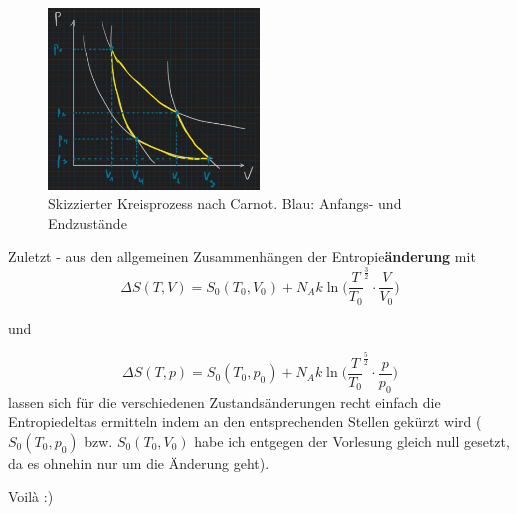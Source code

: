 \begin{figure}[h]
    \centering
    \includegraphics[width=0.5\textwidth]{entries/8/carnot.jpg}
    \caption{Skizzierter Kreisprozess nach Carnot. Blau: Anfangs- und Endzustände}
    \label{fig:carnot}
\end{figure}

Zuletzt - aus den allgemeinen Zusammenhängen der Entropie\textbf{änderung} mit
\begin{equation}
    \Delta S(T,V) = S_0 (T_0 ,V_0 ) + N_A k \ln{\biggl(\frac{T}{T_0}^{\frac{3}{2}} \cdot \frac{V}{V_0}\biggr)}
\end{equation}
\begin{center}
    und
\end{center}
\begin{equation}
    \Delta S(T,p) = S_0 (T_0 ,p_0 ) + N_A k \ln{\biggl(\frac{T}{T_0}^{\frac{5}{2}} \cdot \frac{p}{p_0}\biggr)}
\end{equation}
lassen sich für die verschiedenen Zustandsänderungen recht einfach die Entropiedeltas ermitteln indem an den entsprechenden
Stellen gekürzt wird (\(S_0 (T_0 ,p_0 )\) bzw. \(S_0 (T_0 ,V_0 )\) habe ich entgegen der Vorlesung gleich null gesetzt, da es ohnehin nur um die
Änderung geht).

\begin{center}
    Voilà :)
\end{center}